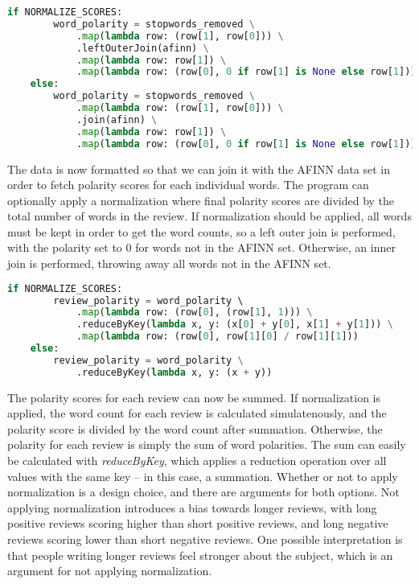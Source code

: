 \documentclass[a4paper]{article}
\begin{document}
\begin{lstlisting}[language=python]
    if NORMALIZE_SCORES:
        word_polarity = stopwords_removed \
            .map(lambda row: (row[1], row[0])) \
            .leftOuterJoin(afinn) \
            .map(lambda row: row[1]) \
            .map(lambda row: (row[0], 0 if row[1] is None else row[1]))
    else:
        word_polarity = stopwords_removed \
            .map(lambda row: (row[1], row[0])) \
            .join(afinn) \
            .map(lambda row: row[1]) \
            .map(lambda row: (row[0], 0 if row[1] is None else row[1]))
\end{lstlisting}

The data is now formatted so that we can join it with the AFINN data set in order to fetch polarity scores for each individual words. The program can optionally apply a normalization where final polarity scores are divided by the total number of words in the review. If normalization should be applied, all words must be kept in order to get the word counts, so a left outer join is performed, with the polarity set to 0 for words not in the AFINN set. Otherwise, an inner join is performed, throwing away all words not in the AFINN set.


\begin{lstlisting}[language=python]
    if NORMALIZE_SCORES:
        review_polarity = word_polarity \ 
            .map(lambda row: (row[0], (row[1], 1))) \
            .reduceByKey(lambda x, y: (x[0] + y[0], x[1] + y[1])) \
            .map(lambda row: (row[0], row[1][0] / row[1][1]))
    else:
        review_polarity = word_polarity \
            .reduceByKey(lambda x, y: (x + y))
\end{lstlisting}

The polarity scores for each review can now be summed. If normalization is applied, the word count for each review is calculated simulatenously, and the polarity score is divided by the word count after summation. Otherwise, the polarity for each review is simply the sum of word polarities. The sum can easily be calculated with \emph{reduceByKey}, which applies a reduction operation over all values with the same key -- in this case, a summation. Whether or not to apply normalization is a design choice, and there are arguments for both options. Not applying normalization introduces a bias towards longer reviews, with long positive reviews scoring higher than short positive reviews, and long negative reviews scoring lower than short negative reviews. One possible interpretation is that people writing longer reviews feel stronger about the subject, which is an argument for not applying normalization.
\end{document}
